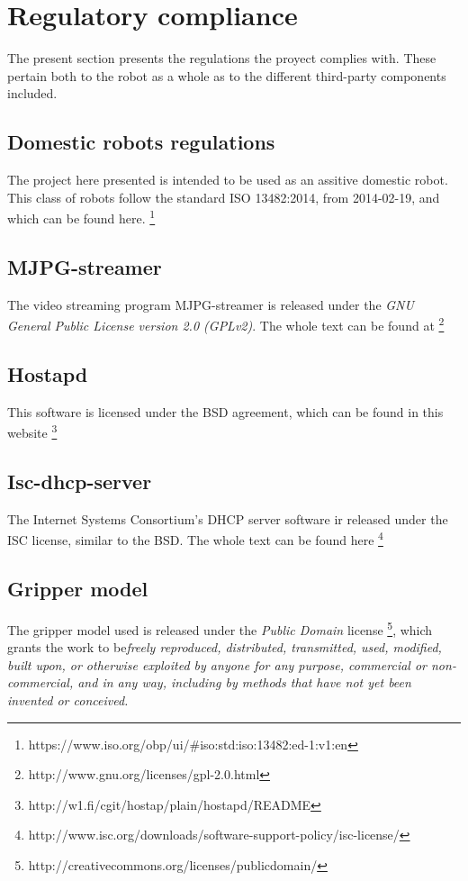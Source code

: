 \section{Regulatory compliance}

The present section presents the regulations the proyect complies with. These pertain both to the robot as a whole as to the different third-party components included.

	\subsection{Domestic robots regulations} The project here presented is intended to be used as an assitive domestic robot. This class of robots follow the standard ISO 13482:2014, from 2014-02-19, and which can be found here. \footnote{https://www.iso.org/obp/ui/\#iso:std:iso:13482:ed-1:v1:en}

	\subsection{MJPG-streamer} The video streaming program MJPG-streamer is released under the \textit{GNU General Public License version 2.0 (GPLv2)}. The whole text can be found at \footnote{http://www.gnu.org/licenses/gpl-2.0.html}

	\subsection{Hostapd} This software is licensed under the BSD agreement, which can be found in this website \footnote{http://w1.fi/cgit/hostap/plain/hostapd/README}

	\subsection{Isc-dhcp-server} The Internet Systems Consortium's DHCP server software ir released under the ISC license, similar to the BSD. The whole text can be found here \footnote{http://www.isc.org/downloads/software-support-policy/isc-license/}

	\subsection{Gripper model} The gripper model  used is released under the \textit{Public Domain} license \footnote{http://creativecommons.org/licenses/publicdomain/}, which grants the work to be\textit{freely reproduced, distributed, transmitted, used, modified, built upon, or otherwise exploited by anyone for any purpose, commercial or non-commercial, and in any way, including by methods that have not yet been invented or conceived.}


